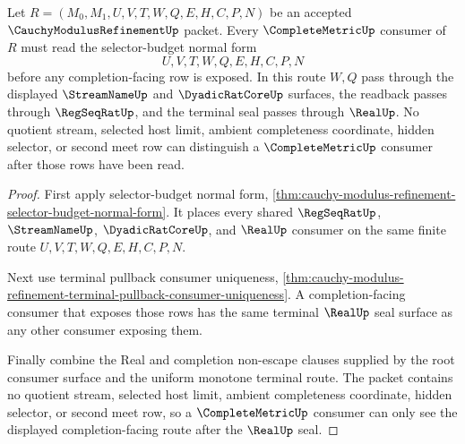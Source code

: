 \begin{theorem}
\label{thm:cauchy-modulus-refinement-complete-metric-consumer-route}
Let $R=(M_0,M_1,U,V,T,W,Q,E,H,C,P,N)$ be an accepted
$\CauchyModulusRefinementUp$ packet. Every $\CompleteMetricUp$ consumer of $R$
must read the selector-budget normal form
$$
U,V,T,W,Q,E,H,C,P,N
$$
before any completion-facing row is exposed. In this route $W,Q$ pass through
the displayed $\StreamNameUp$ and $\DyadicRatCoreUp$ surfaces, the readback
passes through $\RegSeqRatUp$, and the terminal seal passes through $\RealUp$.
No quotient stream, selected host limit, ambient completeness coordinate,
hidden selector, or second meet row can distinguish a $\CompleteMetricUp$
consumer after those rows have been read.
\end{theorem}
\begin{proof}
First apply selector-budget normal form,
\autoref{thm:cauchy-modulus-refinement-selector-budget-normal-form}. It places
every shared $\RegSeqRatUp$, $\StreamNameUp$, $\DyadicRatCoreUp$, and
$\RealUp$ consumer on the same finite route $U,V,T,W,Q,E,H,C,P,N$.

Next use terminal pullback consumer uniqueness,
\autoref{thm:cauchy-modulus-refinement-terminal-pullback-consumer-uniqueness}.
A completion-facing consumer that exposes those rows has the same terminal
$\RealUp$ seal surface as any other consumer exposing them.

Finally combine the Real and completion non-escape clauses supplied by the root
consumer surface and the uniform monotone terminal route. The packet contains
no quotient stream, selected host limit, ambient completeness coordinate,
hidden selector, or second meet row, so a $\CompleteMetricUp$ consumer can only
see the displayed completion-facing route after the $\RealUp$ seal.
\end{proof}

